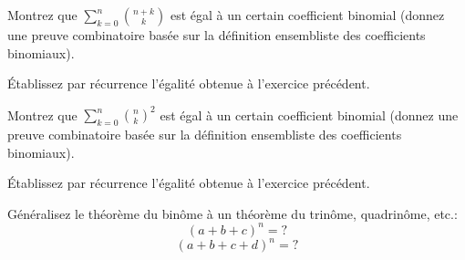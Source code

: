 \documentclass[12pt,french,oneside,a4paper]{memoir} %
\begin{document}
\begin{exo}
  Montrez que $\sum^n_{k=0}\binom {n+k}{k}$ est égal à un certain coefficient binomial (donnez une preuve combinatoire basée sur la définition ensembliste des coefficients binomiaux).
\end{exo}
\begin{exo}
  Établissez par récurrence l'égalité obtenue à l'exercice précédent.
\end{exo}
\begin{exo}
  Montrez que $\sum^n_{k=0}\binom {n}{k}^2$ est égal à un certain coefficient binomial (donnez une preuve combinatoire basée sur la définition ensembliste des coefficients binomiaux).
\end{exo}

\begin{exo}
  Établissez par récurrence l'égalité obtenue à l'exercice précédent.
\end{exo}

\begin{exo}
  Généralisez le théorème du binôme à un théorème du trinôme, quadrinôme, etc.:
  \begin{equation*}
    (a+b+c)^n= ?
  \end{equation*}
  \begin{equation*}
    (a+b+c+d)^n= ?
  \end{equation*}
\end{exo}
\end{document}
